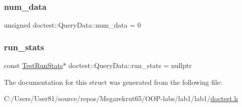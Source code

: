 \subsubsection{\texorpdfstring{num\+\_\+data}{num\_data}}
{\footnotesize\ttfamily unsigned doctest\+::\+Query\+Data\+::num\+\_\+data = 0}

\mbox{\label{structdoctest_1_1_query_data_a435f443f389323f47cb8b0e4202bbea9}} 
\subsubsection{\texorpdfstring{run\+\_\+stats}{run\_stats}}
{\footnotesize\ttfamily const \mbox{\hyperlink{structdoctest_1_1_test_run_stats}{Test\+Run\+Stats}}$\ast$ doctest\+::\+Query\+Data\+::run\+\_\+stats = nullptr}



The documentation for this struct was generated from the following file\+:\begin{DoxyCompactItemize}
\item 
C\+:/\+Users/\+User81/source/repos/\+Megarekrut65/\+O\+O\+P-\/labs/lab1/lab1/\mbox{\hyperlink{doctest_8h}{doctest.\+h}}\end{DoxyCompactItemize}
